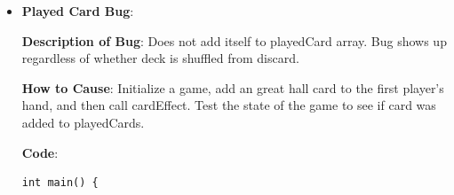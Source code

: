 \documentclass[11pt,letterpaper]{article}
\begin{document}
\begin{enumerate}[label=\Roman*.]
\begin{enumerate}
\begin{itemize}[leftmargin=*]
        \textbf{Description of Bug}: Total card count of deck is less after
            this card is used. Bug shows up regardless of whether deck must
            be shuffled.

        \textbf{How to Cause}: Initialize a game, add an great hall card to 
          the first player's hand, and then call cardEffect.
          Test the state of the game to see if total card count has changed.

        \textbf{Code}:

          \begin{lstlisting}
int main() {
  
  int seed = 1000;                      
  int numPlayers = 2;                   
  struct gameState G, testG;   
  int handpos = 4;                    
  int player = 0;                    
  int coin_bonus = 0;

  int k[10] = {adventurer, embargo, village, minion, mine, cutpurse, sea_hag, tribute, smithy, council_room};
  initializeGame(numPlayers, k, seed, &G);
  memcpy(&testG, &G, sizeof(struct gameState)); 
  cardEffect(great_hall, 0, 0, 0, &testG, handpos, &coin_bonus); 

  int gCount = G.deckCount[player] + G.discardCount[player] + G.handCount[player] + G.playedCardCount;
  int testGCount = testG.deckCount[player] + testG.discardCount[player] + testG.handCount[player] + testG.playedCardCount;
  
  if (gCount == testGCount)
    printf("\tPASSED: Total card count is the same\n");
  else if (gCount < testGCount)
    printf("\t\u274CFAILED: Total card count of deck less than after card effect\n"); 
  else
    printf("\t\u274CFAILED: Total card count of deck greater than after card effect\n");
 
          \end{lstlisting}

        \item \textbf{Played Card Bug}:

        \textbf{Description of Bug}: Does not add itself to playedCard array.
            Bug shows up regardless of whether deck is shuffled from discard.

        \textbf{How to Cause}: Initialize a game, add an great hall card to 
          the first player's hand, and then call cardEffect.
          Test the state of the game to see if card was added to playedCards.

        \textbf{Code}:

          \begin{lstlisting}
int main() {
  

\end{lstlisting}
\end{itemize}
\end{enumerate}
\end{enumerate}
\end{document}
